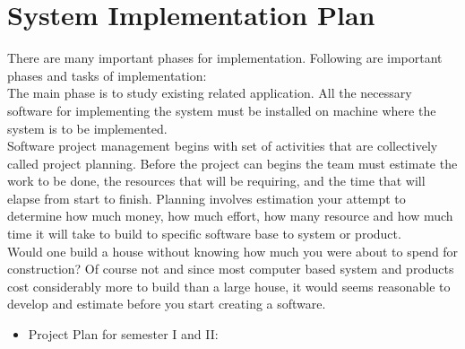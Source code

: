 \section{System Implementation Plan}
\hspace*{0.7in} There are many important phases for implementation. Following are important phases and tasks of implementation: \\
The main phase is to study existing related application. All the necessary software for implementing the system must be installed on machine where the system is to be implemented. \\
\hspace*{0.7in} Software project management begins with set of activities that are collectively called project planning. Before the project can begins the team must estimate the work to be done, the resources that will be requiring, and the time that will elapse from start to finish. Planning involves estimation your attempt to determine how much money, how much effort, how many resource and how much time it will take to build to specific software base to system or product. \\
\hspace*{0.7in} Would one build a house without knowing how much you were about to spend for construction? Of course not and since most computer based system and products cost considerably more to build than a large house, it would seems reasonable to develop and estimate before you start creating a software.

\newpage
\begin{itemize}
  \item Project Plan for semester I and II:
\end{itemize}

